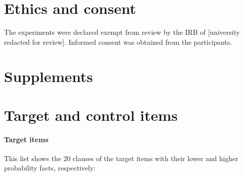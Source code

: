 \documentclass[11pt,fleqn]{article}
\newcommand{\6}{\mbox{$[\hspace*{-.6mm}[$}}
\newcommand{\9}{\mbox{$]\hspace*{-.6mm}]$}}
\begin{document}
\section*{Ethics and consent}

The experiments were declared exempt from review by the IRB of [university redacted for review]. Informed consent was obtained from the participants.




%



\newpage

\appendix

\setcounter{table}{0}
\renewcommand{\thetable}{A\arabic{table}}

\setcounter{figure}{0}
\renewcommand{\thefigure}{A\arabic{figure}}

\section*{Supplements}

\section{Target and control items}\label{a-stim}

\paragraph{Target items} This list shows the 20 clauses of the target items with their lower and higher probability facts, respectively:
\end{document}
